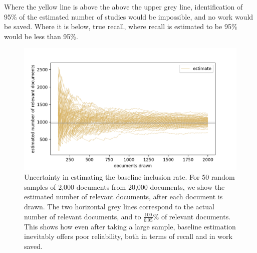 \documentclass{bmcart}
\begin{document}
	Where the yellow line is above the above the upper grey line, identification of 95\% of the estimated number of studies would be impossible, and no work would be saved. Where it is below, true recall, where recall is estimated to be 95\% would be less than 95\%.

	\begin{figure}
	\includegraphics[width=\linewidth]{../images/bir_sampling_noci.png}
	\caption{Uncertainty in estimating the baseline inclusion rate. For 50 random samples of 2,000 documents from 20,000 documents, we show the estimated number of relevant documents, after each document is drawn. The two horizontal grey  lines correspond to the actual number of relevant documents, and to $\frac{100}{0.95}$\% of relevant documents.
	This shows how even after taking a large sample, baseline estimation inevitably offers poor reliability, both in terms of recall and in work saved.
		\label{bir-sampling}
	}
\end{figure}
\end{document}
